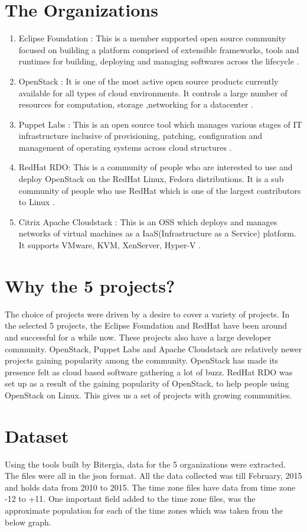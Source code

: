 \documentclass[double,12pt]{beavtex}
\begin{document}
\section{The Organizations}
\begin{enumerate}
\item Eclipse Foundation :
This is a member supported open source community focused on building a platform comprised of extensible frameworks, tools and runtimes for building, deploying and managing softwares across the lifecycle \cite{eclipse}.
\item OpenStack :
It is one of the most active open source products currently available for all types of cloud environments. It controls a large number of resources for computation, storage ,networking for a datacenter \cite{openstack}.
\item Puppet Labs :
This is an open source tool which manages various stages of IT infrastructure inclusive of provisioning, patching, configuration and management of operating systems across cloud structures \cite{puppet}.
\item RedHat RDO:
This is a community of people who are interested to use and deploy OpenStack on the RedHat Linux, Fedora distributions. It is a sub community of people who use RedHat which is one of the largest contributors to Linux \cite{rdo}.
\item Citrix Apache Cloudstack :
This is an OSS which deploys and manages networks of virtual machines as a IaaS(Infrastructure as a Service) platform. It supports VMware, KVM, XenServer, Hyper-V \cite{apache}.
\end{enumerate}

\section{Why the 5 projects?}
The choice of projects were driven by a desire to cover a variety of projects. In the selected 5 projects, the Eclipse Foundation and RedHat have been around and successful for a while now.
These projects also have a large developer community. OpenStack, Puppet Labs and Apache Cloudstack are relatively newer projects gaining popularity among the community. OpenStack has made its presence felt as cloud based software gathering a lot of buzz. RedHat RDO was set up as a result of the gaining popularity of OpenStack, to help people using OpenStack on Linux. This gives us a set of projects with growing communities.

\section{Dataset}
Using the tools built by Bitergia, data for the 5 organizations were extracted. The files were all in the json format. All the data collected was till February, 2015 and
holds data from 2010 to 2015. The time zone files have data from time zone -12 to +11. One important field added to the time zone files, was the approximate population for each of the time zones which was taken from the below graph.
\end{document}
